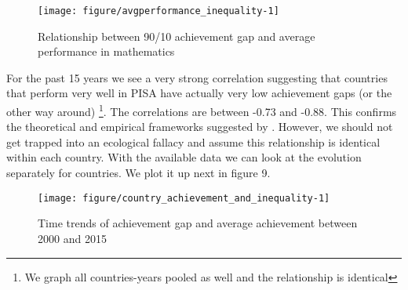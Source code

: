 \documentclass[11pt, a4paper]{article}\usepackage[]{graphicx}\usepackage[]{color}
\begin{document}
\begin{figure}

{\centering \texttt{[image: figure/avgperformance\_inequality-1]} 

}

\caption[Relationship between 90/10 achievement gap and average performance in mathematics]{Relationship between 90/10 achievement gap and average performance in mathematics}\label{fig:avgperformance_inequality}
\end{figure}



For the past 15 years we see a very strong correlation suggesting that countries that perform very well in PISA have actually very low achievement gaps (or the other way around) \footnote{We graph all countries-years pooled as well and the relationship is identical}. The correlations are between -0.73 and -0.88. This confirms the theoretical and empirical frameworks suggested by \citet{werfhorst_mijs}. However, we should not get trapped into an ecological fallacy and assume this relationship is identical within each country. With the available data we can look at the evolution separately for countries. We plot it up next in figure 9.

\begin{figure}

{\centering \texttt{[image: figure/country\_achievement\_and\_inequality-1]} 

}

\caption[Time trends of achievement gap and average achievement between 2000 and 2015]{Time trends of achievement gap and average achievement between 2000 and 2015}\label{fig:country_achievement_and_inequality}
\end{figure}



\end{document}

